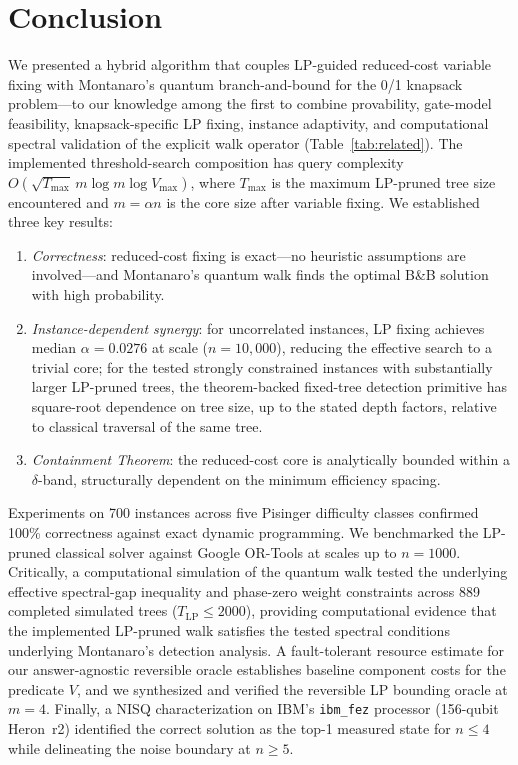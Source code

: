 \documentclass[conference]{IEEEtran} \IEEEoverridecommandlockouts
\begin{document}
\section{Conclusion}

We presented a hybrid algorithm that couples LP-guided reduced-cost variable fixing with Montanaro's quantum branch-and-bound for the 0/1 knapsack problem---to our knowledge among the first to combine provability, gate-model feasibility, knapsack-specific LP fixing, instance adaptivity, and computational spectral validation of the explicit walk operator (Table~\ref{tab:related}). The implemented threshold-search composition has query complexity $O\!\left(\sqrt{T_{\max}}\,m\log m\log V_{\max}\right)$, where $T_{\max}$ is the maximum LP-pruned tree size encountered and $m = \alpha n$ is the core size after variable fixing. We established three key results:

\begin{enumerate}
    \item \textit{Correctness}: reduced-cost fixing is exact---no heuristic assumptions are involved---and Montanaro's quantum walk finds the optimal B\&B solution with high probability.
    \item \textit{Instance-dependent synergy}: for uncorrelated instances, LP fixing achieves median $\alpha = 0.0276$ at scale ($n = 10{,}000$), reducing the effective search to a trivial core; for the tested strongly constrained instances with substantially larger LP-pruned trees, the theorem-backed fixed-tree detection primitive has square-root dependence on tree size, up to the stated depth factors, relative to classical traversal of the same tree.
    \item \textit{Containment Theorem}: the reduced-cost core is analytically bounded within a $\delta$-band, structurally dependent on the minimum efficiency spacing.
\end{enumerate}

Experiments on 700 instances across five Pisinger difficulty classes confirmed 100\% correctness against exact dynamic programming. We benchmarked the LP-pruned classical solver against Google OR-Tools at scales up to $n=1000$. Critically, a computational simulation of the quantum walk tested the underlying effective spectral-gap inequality and phase-zero weight constraints across 889 completed simulated trees ($T_{\text{LP}} \le 2000$), providing computational evidence that the implemented LP-pruned walk satisfies the tested spectral conditions underlying Montanaro's detection analysis. A fault-tolerant resource estimate for our answer-agnostic reversible oracle establishes baseline component costs for the predicate $V$, and we synthesized and verified the reversible LP bounding oracle at $m=4$. Finally, a NISQ characterization on IBM's \texttt{ibm\_fez} processor (156-qubit Heron~r2) identified the correct solution as the top-1 measured state for $n \leq 4$ while delineating the noise boundary at $n \geq 5$.
\end{document}
